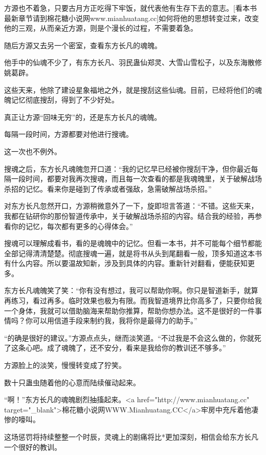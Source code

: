 
\begin{this_body}

方源也不着急，只要古月方正吃得下牢饭，就代表他有生存下去的意志。[看本书最新章节请到棉花糖小说网www.mianhuatang.cc]如何将他的思想转变过来，改变他的三观，从而亲近方源，则是个漫长的过程，不需要着急。

随后方源又去另一个密室，查看东方长凡的魂魄。

他手中的仙魂不少了，有东方长凡、羽民蛊仙郑灵、大雪山雪松子，以及东海散修姚葛辟。

这些天来，他除了建设星象福地之外，就是搜刮这些仙魂。目前，已经将他们的魂魄记忆彻底搜刮，得到了不少好处。

真正让方源“回味无穷”的，还是东方长凡的魂魄。

每隔一段时间，方源都要对他进行搜魂。

这一次也不例外。

搜魂之后，东方长凡魂魄忽开口道：“我的记忆早已经被你搜刮干净，但你最近每隔一段时间，都要对我再次搜魂，而且每一次查看的都是我魂魄里，关于破解战场杀招的记忆。看来你是碰到了传承或者强敌，急需破解战场杀招。”

对东方长凡忽然开口，方源稍微意外了一下，旋即坦言答道：“不错。这些天来，我都在钻研你的那份智道传承中，关于破解战场杀招的内容。结合我的经验，再参看你的记忆，每次都有更多的心得体会。”

搜魂可以理解成看书，看的是魂魄中的记忆。但看一本书，并不可能每个细节都能全部记得清清楚楚。彻底搜魂一遍，就是将书从头到尾翻看一般，顶多知道这本书有什么内容。所以要温故知新，涉及到具体的内容。重新针对翻看，便能获知更多。

东方长凡魂魄笑了笑：“你有没有想过，我可以帮助你啊。你只是智道新手，就算再练习，看过再多。临时效果也极为有限。而我智道境界比你高多了，只要你给我一个身体，我就可以借助脑海来帮助你推算，帮助你想办法。这不是很好的一件事情吗？你可以用信道手段来制约我，我将你是最得力的助手。”

“的确是很好的建议。”方源点点头，继而淡笑道。“不过我是不会这么做的，你就死了这条心吧。成了魂魄了，还不安分，看来是我给你的教训还不够多。”

方源脸上的淡笑，慢慢转变成了狞笑。

数十只蛊虫随着他的心意而陆续催动起来。

“啊！”东方长凡的魂魄剧烈抽搐起来。<a href="http://www.mianhuatang.cc" target="\_blank">棉花糖小说网WWW.Mianhuatang.CC</a>牢房中充斥着他凄惨的嚎叫。

这场惩罚将持续整整一个时辰，灵魂上的剧痛将比*更加深刻，相信会给东方长凡一个很好的教训。


\end{this_body}

